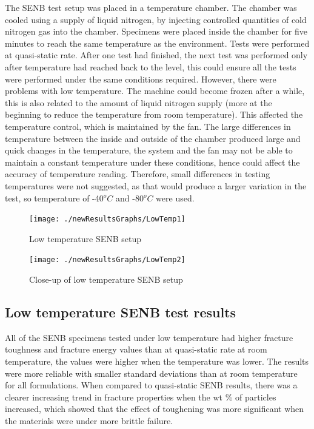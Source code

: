 \documentclass[numbers=noendperiod,chapterprefix=on]{icldt} %
\begin{document}
The SENB test setup was placed in a temperature chamber. The chamber was cooled using a supply of liquid nitrogen, by injecting controlled quantities of cold nitrogen gas into the chamber. Specimens were placed inside the chamber for five minutes to reach the same temperature as the environment. Tests were performed at quasi-static rate. After one test had finished, the next test was performed only after temperature had reached back to the level, this could ensure all the tests were performed under the same conditions required. 
However, there were problems with low temperature. The machine could become frozen after a while, this is also related to the amount of liquid nitrogen supply (more at the beginning to reduce the temperature from room temperature). This affected the temperature control, which is maintained by the fan. The large differences in temperature between the inside and outside of the chamber produced large and quick changes in the temperature, the system and the fan may not be able to maintain a constant temperature under these conditions, hence could affect the accuracy of temperature reading. Therefore, small differences in testing temperatures were not suggested, as that would produce a larger variation in the test, so temperature of -40$^oC$ and -80$^oC$ were used.

\begin{figure}[!h]
\centering
\texttt{[image: ./newResultsGraphs/LowTemp1]}\label{LowTemp1}
\caption{Low temperature SENB setup}
\end{figure}
\FloatBarrier

\begin{figure}[!h]
\centering
\texttt{[image: ./newResultsGraphs/LowTemp2]}\label{LowTemp2}
\caption{Close-up of low temperature SENB setup}
\end{figure}
\FloatBarrier

\newpage

\subsection{Low temperature SENB test results} \label{LowTemp}
All of the SENB specimens tested under low temperature had higher fracture toughness and fracture energy values than at quasi-static rate at room temperature, the values were higher when the temperature was lower. The results were more reliable with smaller standard deviations than at room temperature for all formulations. When compared to quasi-static SENB results, there was a clearer increasing trend in fracture properties when the wt \% of particles increased, which showed that the effect of toughening was more significant when the materials were under more brittle failure. 
\end{document}
